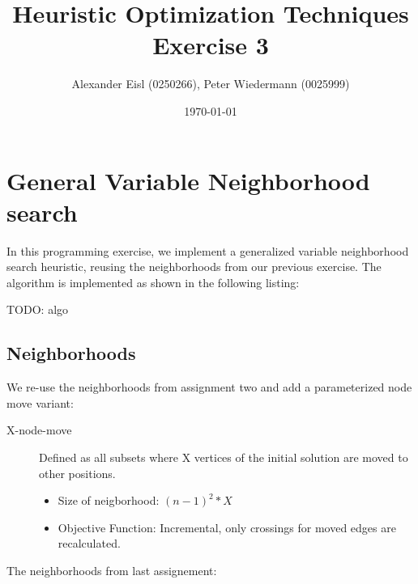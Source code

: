 \documentclass{scrartcl}
\author{Alexander Eisl (0250266), Peter Wiedermann (0025999)}
\date{\today}
\title{Heuristic Optimization Techniques \\ Exercise 3}
\begin{document}
\maketitle


\section{General Variable Neighborhood search}
\label{sec:general_vns}

In this programming exercise, we implement a  generalized variable neighborhood
search heuristic, reusing the neighborhoods from our previous exercise.
The algorithm is implemented as shown in the following listing:

TODO: algo


\subsection{Neighborhoods}
\label{neighborhoods}
We re-use the neighborhoods from assignment two and add a parameterized node move variant:

\begin{description}
\item[X-node-move] 
Defined as all subsets where X vertices of the initial solution are moved to other positions.

\begin{itemize}
\item Size of neigborhood: $(n-1)^2 * X $
\item Objective Function: Incremental, only crossings for moved edges are recalculated.
\end{itemize}

\end{description}
 
The neighborhoods from last assignement:
\end{document}
